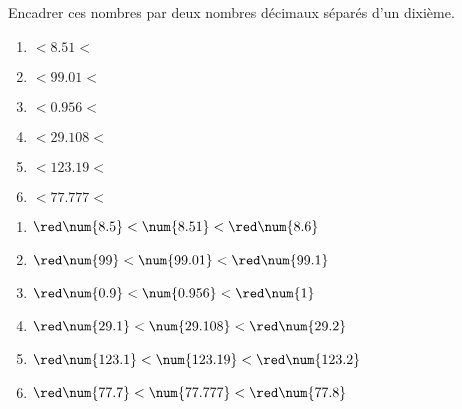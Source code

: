 \begin{exercice}
    Encadrer ces nombres par deux nombres décimaux séparés d'un dixième.
    \begin{multicols}{2}
        \begin{enumerate}
            \item \makebox[0.2\linewidth]{\dotfill}$<\num{8.51  }<$ \makebox[0.2\linewidth]{\dotfill}
            \item \makebox[0.2\linewidth]{\dotfill}$<\num{99.01 }<$ \makebox[0.2\linewidth]{\dotfill}
            \item \makebox[0.2\linewidth]{\dotfill}$<\num{0.956 }<$ \makebox[0.2\linewidth]{\dotfill}
            \item \makebox[0.2\linewidth]{\dotfill}$<\num{29.108}<$ \makebox[0.2\linewidth]{\dotfill}
            \item \makebox[0.2\linewidth]{\dotfill}$<\num{123.19}<$ \makebox[0.2\linewidth]{\dotfill}
            \item \makebox[0.2\linewidth]{\dotfill}$<\num{77.777}<$ \makebox[0.2\linewidth]{\dotfill}
        \end{enumerate}
    \end{multicols}

 \end{exercice}
 
\begin{corrige}
    \phantom{rrr}

    \begin{enumerate}
        \item ${\red\num{8.5  }} < \num{8.51  } < {\red \num{8.6  }}$
        \item ${\red\num{99   }} < \num{99.01 } < {\red \num{99.1 }}$
        \item ${\red\num{0.9  }} < \num{0.956 } < {\red \num{1    }}$
        \item ${\red\num{29.1 }} < \num{29.108} < {\red \num{29.2 }}$
        \item ${\red\num{123.1}} < \num{123.19} < {\red \num{123.2}}$
        \item ${\red\num{77.7 }} < \num{77.777} < {\red \num{77.8 }}$
    \end{enumerate}
\end{corrige}